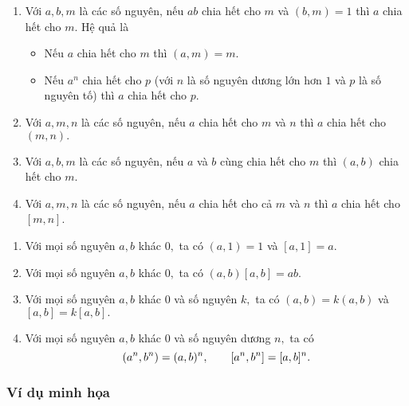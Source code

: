 \begin{light}
\begin{enumerate}
    \item Với $a,b,m$ là các số nguyên, nếu $ab$ chia hết cho $m$ và $(b,m)=1$ thì $a$ chia hết cho $m.$ Hệ quả là
    \begin{itemize}
        \item Nếu $a$ chia hết cho $m$ thì $(a,m)=m.$
        \item Nếu $a^n$ chia hết cho $p$ (với $n$ là số nguyên dương lớn hơn $1$ và $p$ là số nguyên tố) thì $a$ chia hết cho $p.$
    \end{itemize}
    \item Với $a,m,n$ là các số nguyên, nếu $a$ chia hết cho $m$ và $n$ thì $a$ chia hết cho $(m,n).$ 
    \item Với $a,b,m$ là các số nguyên, nếu $a$ và $b$ cùng chia hết cho $m$ thì $(a,b)$ chia hết cho $m.$    
    \item Với $a,m,n$ là các số nguyên, nếu $a$ chia hết cho cả $m$ và $n$ thì $a$ chia hết cho $[m,n]$.  
\end{enumerate}
\begin{enumerate}
    \item Với mọi số nguyên $a,b$ khác $0,$ ta có $(a,1)=1$ và $[a,1]=a.$
    \item Với mọi số nguyên $a,b$ khác $0,$ ta có $(a,b)[a,b]=ab.$    
    \item Với mọi số nguyên $a,b$ khác $0$ và số nguyên $k,$ ta có $(a,b)=k(a,b)$ và $[a,b]=k[a,b].$
    \item Với mọi số nguyên $a,b$ khác $0$ và số nguyên dương $n,$ ta có \[\left(\displaystyle a^n,b^n \right)=(a,b)^n,\qquad [a^n,b^n]=[a,b]^n.\]   
\end{enumerate}
\end{light}
\subsubsection*{Ví dụ minh họa}
 
